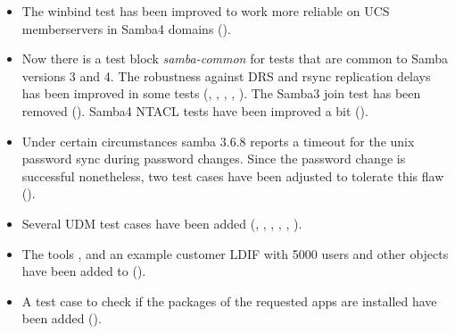 \begin{itemize}
\item The winbind test has been improved to work more reliable on UCS memberservers in Samba4 domains ().

\item Now there is a test block \emph{samba-common} for tests that are common to Samba versions 3 and 4.
The robustness against DRS and rsync replication delays has been improved in some tests (, , , , ). The Samba3 join test has been removed (). Samba4 NTACL tests have been improved a bit ().

\item Under certain circumstances samba 3.6.8 reports a timeout for the unix password sync during password changes. Since the password change is successful nonetheless, two test cases have been adjusted to tolerate this flaw ().

\item Several UDM test cases have been added (, , , , , ).

\item The tools , 
and an example customer LDIF with 5000 users and other objects have been added to
 ().

\item A test case to check if the packages of the requested apps are installed have been added ().

\end{itemize}

